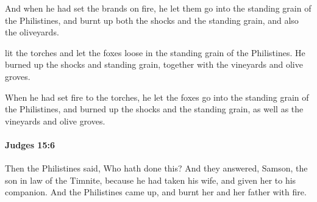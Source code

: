 			\begin{versebox}
					\item[BHS] 
					\item[ASV] And when he had set the brands on fire, he let them go into the standing grain of the Philistines, and burnt up both the shocks and the standing grain, and also the oliveyards.
					\item[NIV] lit the torches and let the foxes loose in the standing grain of the Philistines. He burned up the shocks and standing grain, together with the vineyards and olive groves.
					\item[NRSV] When he had set fire to the torches, he let the foxes go into the standing grain of the Philistines, and burned up the shocks and the standing grain, as well as the vineyards and olive groves.
			\end{versebox}

		\paragraph{Judges 15:6} %
			\label{JUDGES-15-6}

			Then the Philistines said, Who hath done this? And they answered, Samson, the son in law of the Timnite, because he had taken his wife, and given her to his companion. And the Philistines came up, and burnt her and her father with fire.

